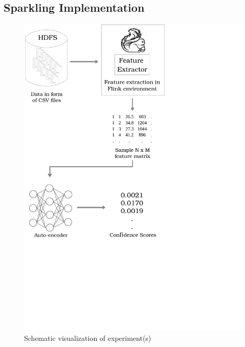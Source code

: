 \documentclass{vldb}
\begin{document}
\subsection{Sparkling Implementation}
\label{subsec:sparkling-impl}

\begin{figure}
\centering
\includegraphics[trim=0cm 9cm 7.4cm 0cm, clip=true, width=0.8\linewidth]{"pics/approach2"}
\caption{Schematic visualization of experiment(s)}
\label{fig:approach-2}
\end{figure}
\end{document}
